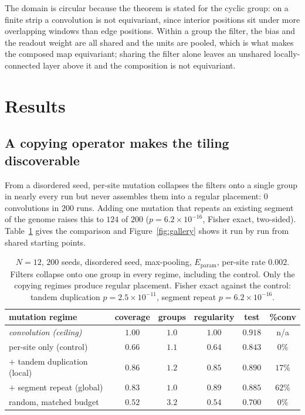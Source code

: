 \documentclass[11pt]{article}
\begin{document}
The domain is circular because the theorem is stated for the cyclic group: on a finite strip a
convolution is not equivariant, since interior positions sit under more overlapping windows
than edge positions. Within a group the filter, the bias and the readout weight are all shared and the units are pooled, which
is what makes the composed map equivariant; sharing the filter alone leaves an unshared
locally-connected layer above it and the composition is not equivariant.

\section{Results}

\subsection{A copying operator makes the tiling discoverable}

From a disordered seed, per-site mutation collapses the filters onto a single group in nearly every run
but never assembles them into a regular placement: $0$ convolutions in $200$ runs. Adding one mutation
that repeats an existing segment of the genome raises this to $124$ of $200$
($p = 6.2\times10^{-16}$, Fisher exact, two-sided). Table~\ref{tab:main} gives the comparison and
Figure~\ref{fig:gallery} shows it run by run from shared starting points.

\begin{table}[t]
\centering\small
\begin{tabular}{@{}lccccc@{}}
\toprule
mutation regime & coverage & groups & regularity & test & \%conv \\
\midrule
\emph{convolution (ceiling)}   & $1.00$ & $1.0$ & $1.00$ & $0.918$ & n/a \\
\midrule
per-site only (control)        & $0.66$ & $1.1$ & $0.64$ & $0.843$ & $0\%$ \\
$+$ tandem duplication (local) & $0.86$ & $1.2$ & $0.85$ & $0.890$ & $17\%$ \\
$+$ segment repeat (global)    & $0.83$ & $1.0$ & $0.89$ & $0.885$ & $62\%$ \\
\midrule
random, matched budget         & $0.52$ & $3.2$ & $0.54$ & $0.700$ & $0\%$ \\
\bottomrule
\end{tabular}
\caption{$N=12$, $200$ seeds, disordered seed, max-pooling, $E_{\text{param}}$, per-site rate $0.002$.
Filters collapse onto one group in every regime, including the control. Only the copying regimes produce
regular placement. Fisher exact against the control: tandem duplication $p = 2.5\times10^{-11}$, segment
repeat $p = 6.2\times10^{-16}$.}
\label{tab:main}
\end{table}
\end{document}

